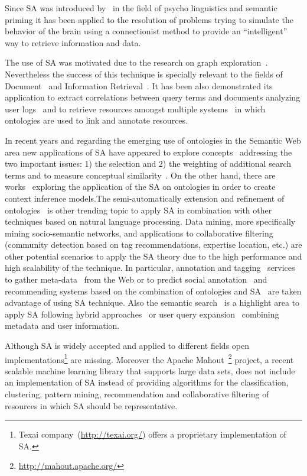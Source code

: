 Since SA was introduced by~\cite{Collins_Loftus_1975} in the field of 
psycho linguistics and semantic priming it has been applied to the resolution
of problems trying to simulate the behavior of the brain using a connectionist method
to provide an ``intelligent'' way to retrieve information and data. 

The use of SA was motivated due to the research on graph exploration~\cite{Scott1981,AndersonTheory}. Nevertheless
the success of this technique is specially relevant to the fields of Document~\cite{turtle91inference} 
and Information Retrieval~\cite{Cohen1987}. It has
been also demonstrated its application to extract correlations between query terms and documents analyzing user 
logs~\cite{Cui03} and to retrieve resources amongst multiple systems~\cite{Schumacher+2008search} 
in which ontologies are used to link and annotate resources.

In recent years and regarding the emerging use of ontologies in the Semantic Web area new applications of SA have
appeared to explore concepts~\cite{Qiu93,Chen95} addressing the two important issues: 1) the selection and 2) the weighting of
additional search terms and to measure conceptual similarity~\cite{gouws-vanrooyen-engelbrecht:2010:CCSR}. 
On the other hand, there are works~\cite{DBLP:journals/cogsr/KatiforiVD10} 
exploring the application of the SA on ontologies in order to create context inference models.The 
semi-automatically extension and refinement of ontologies~\cite{liu_et_al_2005} is other trending topic to apply SA
in combination with other techniques based on natural language processing. Data mining,
more specifically mining socio-semantic networks\cite{paper:troussov:2008}, and applications 
to collaborative filtering (community detection based on tag recommendations, expertise location, etc.) are other 
potential scenarios to apply the SA theory due to the high performance and high scalability of the technique. In particular, 
annotation and tagging~\cite{labraTagging2007} services to gather meta-data~\cite{GelgiVD05} from the Web or to predict social annotation~\cite{Chen:2007:PSA:1780653.1780702} and recommending 
systems based on the combination of ontologies and SA~\cite{citeulike:3779904} are taken advantage of using SA technique. 
Also the semantic search~\cite{conf-sofsem-Suchal08} is a highlight area to apply SA following
hybrid approaches~\cite{bopaEstonia,RochaSA04} or user query expansion~\cite{767402} combining metadata 
and user information.

Although SA is widely accepted and applied to different fields open implementations\footnote{ 
Texai company~(\url{http://texai.org/}) offers a proprietary implementation of SA.} are missing. Moreover 
the Apache Mahout~\footnote{\url{http://mahout.apache.org/}} project, a recent scalable machine learning library 
that supports large data sets, does not include an implementation of SA instead of 
providing algorithms for the classification, clustering, pattern mining, 
recommendation and collaborative filtering of resources in which SA should be representative. 
 
